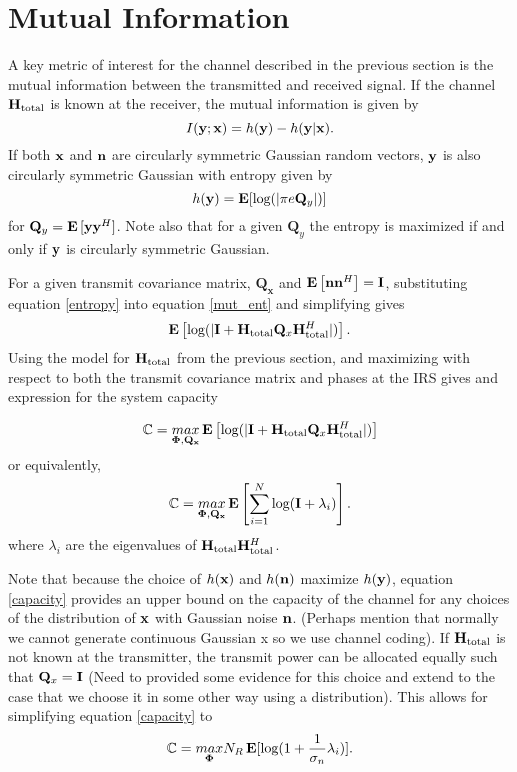 \documentclass[12pt,a4paper]{report}
\begin{document}
\section{Mutual Information}\label{sectiond:mut_info}
A key metric of interest for the channel described in the previous section is the mutual information between the transmitted and received signal. If the channel $\mathbf{H}_\text{total}$ is known at the receiver, the mutual information is given by 
\begin{equation}\label{mut_ent}
I(\mathbf{y};\mathbf{x}) = h(\mathbf{y}) - h(\mathbf{y}|\mathbf{x}).
\end{equation}
If both $\mathbf{x}$ and $\mathbf{n}$ are circularly symmetric Gaussian random vectors, $\mathbf{y}$ is also circularly symmetric Gaussian with entropy given by \cite{telatar1999capacity} 
\begin{equation}\label{entropy}
h(\mathbf{y}) = \mathop{\bf E{}}[\text{log{}}(|\pi e \mathbf{Q}_{y}|)]
\end{equation}
 for $\mathbf{Q}_{y} = \mathop{\bf E{}}{[\mathbf{y} \mathbf{y}^H]}$. Note also that for a given $\mathbf{Q}_{y}$ the entropy is maximized if and only if $\mathbf{y}$ is circularly symmetric Gaussian.

For a given transmit covariance matrix, $\mathbf{Q_x}$ and $\mathop{\bf E{}}\left[\mathbf{n}\mathbf{n}^H \right] = \mathbf{I}$, substituting equation \eqref{entropy} into equation
\eqref{mut_ent} and simplifying gives
\begin{equation}\label{mut_inf}
\mathop{\bf E{}} \left[\text{log{}}(|\mathbf{I} + \mathbf{H}_\text{total} \mathbf{Q}_x \mathbf{H}_\text{total}^H|)\right].
\end{equation}
Using the model for $\mathbf{H}_\text{total}$ from the previous section, and maximizing with respect to both the
transmit covariance matrix and phases at the IRS gives and expression for the system capacity

\begin{equation}\label{capacity}
\mathbb{C} = \underset{\boldsymbol{\Phi},\mathbf{Q_x}}{\mathop{max}} \mathop{\bf E{}} \left[\text{log{}}(|\mathbf{I} + \mathbf{H}_\text{total} \mathbf{Q}_x \mathbf{H}_\text{total}^H|)\right]
\end{equation}
or equivalently,
\begin{equation}
\mathbb{C} = \underset{\boldsymbol{\Phi},\mathbf{Q_x}}{\mathop{max}} \mathop{\bf E{}} \left[\sum_{i=1}^{N}\text{log{}}(\mathbf{I} + \lambda_i)\right].
\end{equation}
where $\lambda_i$ are the eigenvalues of $\mathbf{H}_\text{total} \mathbf{H}_\text{total}^H$.

Note that because the choice of $h(\mathbf{x}) $ and $h(\mathbf{n})$ maximize $h(\mathbf{y})$, equation \eqref{capacity} provides an upper bound on the capacity of the channel for any choices of the distribution of $\mathbf{x} $ with Gaussian noise $\mathbf{n}$. (Perhaps mention that normally we cannot generate continuous Gaussian x so we use channel coding).
If $\mathbf{H}_\text{total}$ is not known at the transmitter, the transmit power can be allocated
equally such that $\mathbf{Q}_x = \mathbf{I}$ (Need to provided some evidence for this choice and extend to the case that we choose it in some other way using a distribution). This allows for simplifying equation \eqref{capacity} to 
\begin{equation}\label{no_csi_capacity}
\mathbb{C} = \underset{\boldsymbol{\Phi}}{\mathop{max}} N_R \mathop{\bf E{}}[\text{log{}}(1 + \frac{1}{\sigma_n}\lambda_i)].
\end{equation}
\end{document}
